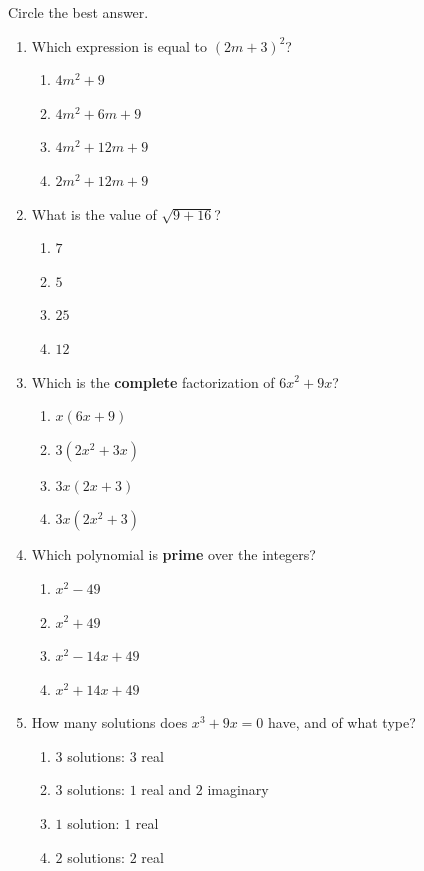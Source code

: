 \noindent\small Circle the best answer.

\begin{enumerate}[leftmargin=1.8em, itemsep=6pt, topsep=5pt]
\small

\item Which expression is equal to $(2m+3)^2$?
\begin{enumerate}[label=(\Alph*), leftmargin=2.2em, itemsep=1pt, topsep=2pt]
  \item $4m^2+9$
  \item $4m^2+6m+9$
  \item $4m^2+12m+9$
  \item $2m^2+12m+9$
\end{enumerate}

\item What is the value of $\sqrt{9+16}$?
\begin{enumerate}[label=(\Alph*), leftmargin=2.2em, itemsep=1pt, topsep=2pt]
  \item $7$
  \item $5$
  \item $25$
  \item $12$
\end{enumerate}

\item Which is the \textbf{complete} factorization of $6x^2+9x$?
\begin{enumerate}[label=(\Alph*), leftmargin=2.2em, itemsep=1pt, topsep=2pt]
  \item $x(6x+9)$
  \item $3(2x^2+3x)$
  \item $3x(2x+3)$
  \item $3x(2x^2+3)$
\end{enumerate}

\item Which polynomial is \textbf{prime} over the integers?
\begin{enumerate}[label=(\Alph*), leftmargin=2.2em, itemsep=1pt, topsep=2pt]
  \item $x^2-49$
  \item $x^2+49$
  \item $x^2-14x+49$
  \item $x^2+14x+49$
\end{enumerate}

\item How many solutions does $x^3+9x=0$ have, and of what type?
\begin{enumerate}[label=(\Alph*), leftmargin=2.2em, itemsep=1pt, topsep=2pt]
  \item $3$ solutions: $3$ real
  \item $3$ solutions: $1$ real and $2$ imaginary
  \item $1$ solution: $1$ real
  \item $2$ solutions: $2$ real
\end{enumerate}


\end{enumerate}

